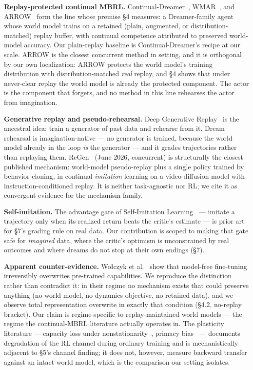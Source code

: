 \documentclass[10pt]{article}
\begin{document}
\textbf{Replay-protected continual MBRL.} Continual-Dreamer~\cite{kessler2023effectiveness},
WMAR~\cite{yang2024augmenting}, and ARROW~\cite{alyahya2026arrow} form the line whose premise
\S4 measures: a Dreamer-family agent whose world model trains on a retained (plain,
augmented, or distribution-matched) replay buffer, with continual competence attributed to
preserved world-model accuracy. Our plain-replay baseline is Continual-Dreamer's recipe at
our scale. ARROW is the closest concurrent method in setting, and it is orthogonal by our own
localization: ARROW protects the world model's training distribution with distribution-matched
\emph{real} replay, and \S4 shows that under never-clear replay the world model is already
the protected component. The actor is the component that forgets, and no method in this line
rehearses the actor from imagination.

\textbf{Generative replay and pseudo-rehearsal.} Deep Generative
Replay~\cite{shin2017continual} is the ancestral idea: train a generator of past data and
rehearse from it. Dream rehearsal is imagination-native --- no generator is trained, because
the world model already in the loop \emph{is} the generator --- and it grades trajectories
rather than replaying them. ReGen~\cite{govind2026world} (June 2026, concurrent) is
structurally the closest published mechanism: world-model pseudo-replay plus a single policy
trained by behavior cloning, in continual \emph{imitation} learning on a video-diffusion
model with instruction-conditioned replay. It is neither task-agnostic nor RL; we cite it as
convergent evidence for the mechanism family.

\textbf{Self-imitation.} The advantage gate of Self-Imitation
Learning~\cite{oh2018self} --- imitate a trajectory only when its realized return beats the
critic's estimate --- is prior art for \S7's grading rule on real data. Our contribution is
scoped to making that gate safe for \emph{imagined} data, where the critic's optimism is
unconstrained by real outcomes and where dreams do not stop at their own endings (\S7).

\textbf{Apparent counter-evidence.} Wo\l{}czyk et al.~\cite{wolczyk2024fine} show that
model-free fine-tuning irreversibly overwrites pre-trained capabilities. We reproduce the
distinction rather than contradict it: in their regime no mechanism exists that could
preserve anything (no world model, no dynamics objective, no retained data), and we observe
total representation overwrite in exactly that condition (\S4.2, no-replay bracket). Our
claim is regime-specific to replay-maintained world models --- the regime the continual-MBRL
literature actually operates in. The plasticity literature --- capacity loss under nonstationarity~\cite{lyle2022understanding},
primacy bias~\cite{nikishin2022primacy} --- documents degradation of the RL channel during
ordinary training and is mechanistically adjacent to \S5's channel finding; it does not,
however, measure backward transfer against an intact world model, which is the comparison our
setting isolates.
\end{document}
